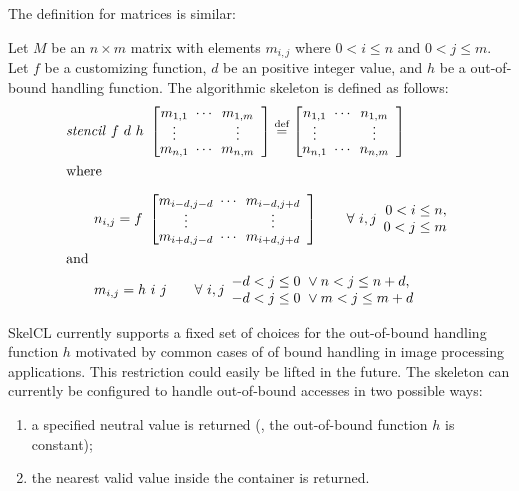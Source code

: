 \noindent
The definition for matrices is similar:
\begin{definition}
  \label{definition:mapoverlap:matrix}
  Let $M$ be an $n\times m$ matrix with elements $m_{i,j}$ where $0 < i \leq n$ and $0 < j \leq m$.
  Let $f$ be a customizing function, $d$ be an positive integer value, and $h$ be a out-of-bound handling function.
  The algorithmic skeleton \stencil is defined as follows:
  \begin{equation*}
    \begin{split}
    & \stencil\ f\  d\ h\ \DottedMatrix{m_{1,1}}{m_{1,m}}{m_{n,1}}{m_{n,m}}
               \eqdef \DottedMatrix{n_{1,1}}{n_{1,m}}{n_{n,1}}{n_{n,m}}\\
               &\text{where}\\[.5em]
    &\qquad n_{i,j} = f\ \DottedMatrix{m_{i-d,j-d}}{m_{i-d,j+d}}{m_{i+d,j-d}}{m_{i+d,j+d}} \qquad \forall\ i,j
        \begin{array}{r} 0 < i \leq n,\\ 0 < j \leq m \end{array}\\
        &\text{and}\\
    &\qquad m_{i,j} = h\ i\ j \qquad \forall\ i,j \begin{array}{l} -d < j \leq 0\ \vee n < j \leq n+d,\\ -d < j \leq 0\ \vee m < j \leq m+d \end{array}
    \end{split}
  \end{equation*}
\end{definition}


SkelCL currently supports a fixed set of choices for the out-of-bound handling function $h$ motivated by common cases of of bound handling in image processing applications.
This restriction could easily be lifted in the future.
The \stencil skeleton can currently be configured to handle out-of-bound accesses in two possible ways:
\begin{enumerate}
  \item a specified neutral value is returned (\ie, the out-of-bound function $h$ is constant);
  \item the nearest valid value inside the container is returned.
\end{enumerate}

